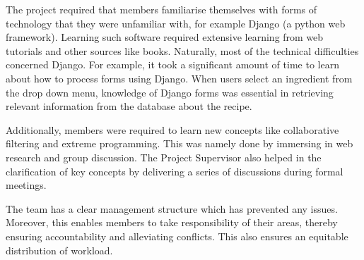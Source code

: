 The project required that members familiarise themselves with forms of technology that they were unfamiliar with, for example Django (a python web framework). Learning such software required extensive learning from web tutorials and other sources like books. Naturally, most of the technical difficulties concerned Django. For example, it took a significant amount of time to learn about how to process forms using Django. When users select an ingredient from the drop down menu, knowledge of Django forms was essential in retrieving relevant information from the database about the recipe. 

Additionally, members were required to learn new concepts like collaborative filtering and extreme programming. This was namely done by immersing in web research and group discussion. The Project Supervisor also helped in the clarification of key concepts by delivering a series of discussions during formal meetings.

The team has a clear management structure which has prevented any issues. Moreover, this enables members to take responsibility of their areas, thereby ensuring accountability and alleviating conflicts. This also ensures an equitable distribution of workload.

